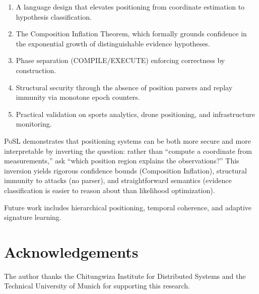 \documentclass[twocolumn,10pt]{article}
\begin{document}
\begin{enumerate}[leftmargin=1.5em,topsep=2pt,itemsep=1pt]
  \item A language design that elevates positioning from coordinate
    estimation to hypothesis classification.

  \item The Composition Inflation Theorem, which formally grounds confidence
    in the exponential growth of distinguishable evidence hypotheses.

  \item Phase separation (COMPILE/EXECUTE) enforcing correctness by
    construction.

  \item Structural security through the absence of position parsers and
    replay immunity via monotone epoch counters.

  \item Practical validation on sports analytics, drone positioning, and
    infrastructure monitoring.
\end{enumerate}

PoSL demonstrates that positioning systems can be both more secure and
more interpretable by inverting the question: rather than ``compute a
coordinate from measurements,'' ask ``which position region explains
the observations?'' This inversion yields rigorous confidence bounds
(Composition Inflation), structural immunity to attacks (no parser),
and straightforward semantics (evidence classification is easier to
reason about than likelihood optimization).

Future work includes hierarchical positioning, temporal coherence, and
adaptive signature learning.

\section*{Acknowledgements}

The author thanks the Chitungwiza Institute for Distributed Systems and
the Technical University of Munich for supporting this research.



\end{document}

